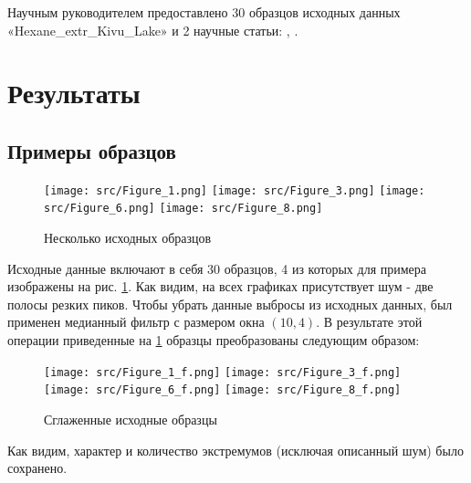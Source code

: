 \documentclass[a4paper]{article}
\begin{document}
Научным руководителем предоставлено 30 образцов исходных данных \\«Hexane_extr_Kivu_Lake» и 2 научные статьи: \cite{article1}, \cite{article2}. 
\section{Результаты}
\subsection{Примеры образцов}
\begin{figure}[H]
    \centering
    \texttt{[image: src/Figure\_1.png]}
    \texttt{[image: src/Figure\_3.png]}
    \texttt{[image: src/Figure\_6.png]}
    \texttt{[image: src/Figure\_8.png]}
    \caption{Несколько исходных образцов}
    \label{fig:samples}
\end{figure}
Исходные данные включают в себя 30 образцов, 4 из которых для примера изображены на рис. \ref{fig:samples}. Как видим, на всех графиках присутствует шум - две полосы резких пиков. Чтобы убрать данные выбросы из исходных данных, был применен медианный фильтр с размером окна $(10, 4)$. В результате этой операции приведенные на \ref{fig:samples} образцы преобразованы следующим образом:
\begin{figure}[H]
    \centering
    \texttt{[image: src/Figure\_1\_f.png]}
    \texttt{[image: src/Figure\_3\_f.png]}
    \texttt{[image: src/Figure\_6\_f.png]}
    \texttt{[image: src/Figure\_8\_f.png]}
    \caption{Сглаженные исходные образцы}
    \label{fig:samples_filtered}
\end{figure}
Как видим, характер и количество экстремумов (исключая описанный шум) было сохранено.
\end{document}
